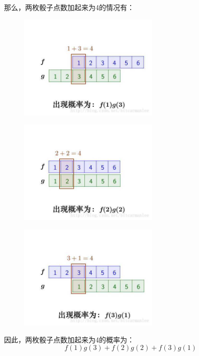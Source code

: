 那么，两枚骰子点数加起来为4的情况有：
\begin{figure}[hpbt]
  \centering
  \includegraphics[width=0.6\textwidth]{图像及其数学与物理背景/Figures/色子3}
\end{figure}

\begin{figure}[hpbt]
  \centering
  \includegraphics[width=0.6\textwidth]{图像及其数学与物理背景/Figures/色子4}
\end{figure}

\begin{figure}[hpbt]
  \centering
  \includegraphics[width=0.6\textwidth]{图像及其数学与物理背景/Figures/色子5}
\end{figure}

因此，两枚骰子点数加起来为4的概率为：
\begin{equation}
  f(1)g(3)+f(2)g(2)+f(3)g(1)
\end{equation}

